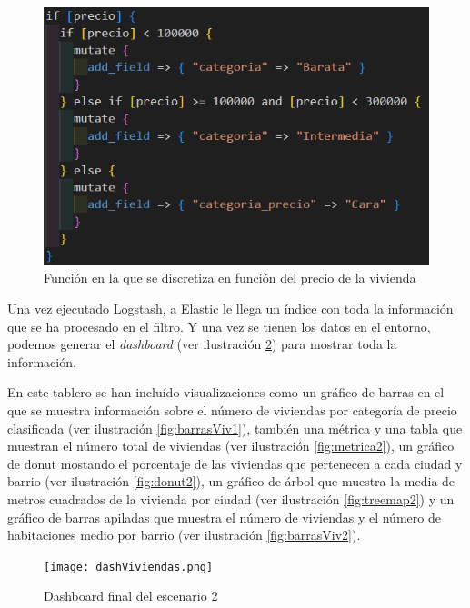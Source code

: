 \begin{figure}
    \centering
    \includegraphics[width=1\linewidth]{img/discretizacion.png}
    \caption{Función en la que se discretiza en función del precio de la vivienda}
    \label{fig:discre}
\end{figure}

Una vez ejecutado Logstash, a Elastic le llega un índice con toda la información que se ha procesado en el filtro. Y una vez se tienen los datos en el entorno, podemos generar el \textit{dashboard}  (ver ilustración  \ref{fig:dashboard2}) para mostrar toda la información.

En este tablero se han incluído visualizaciones como un gráfico de barras en el que se muestra información sobre el número de viviendas por categoría de precio clasificada  (ver ilustración  \ref{fig:barrasViv1}), también una métrica y una tabla que muestran el número total de viviendas  (ver ilustración  \ref{fig:metrica2}), un gráfico de donut mostando el porcentaje de las viviendas que pertenecen a cada ciudad y barrio  (ver ilustración  \ref{fig:donut2}), un gráfico de árbol que muestra la media de metros cuadrados de la vivienda por ciudad  (ver ilustración  \ref{fig:treemap2}) y un gráfico de barras apiladas que muestra el número de viviendas y el número de habitaciones medio por barrio  (ver ilustración  \ref{fig:barrasViv2}).

\begin{figure}
    \centering
    \texttt{[image: dashViviendas.png]}
    \caption{Dashboard final del escenario 2}
    \label{fig:dashboard2}
\end{figure}

